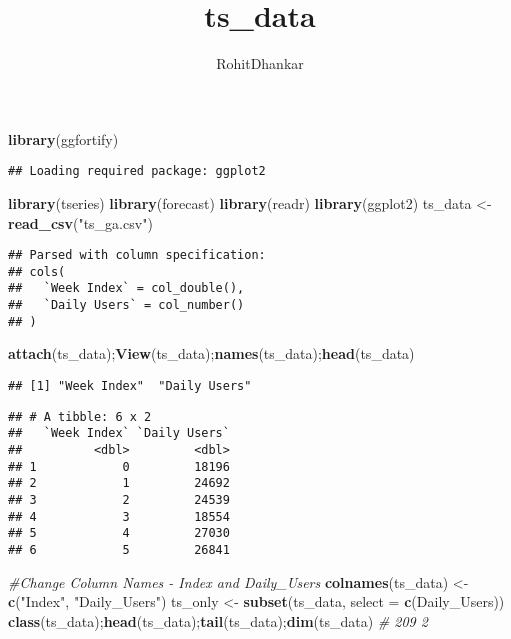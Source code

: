 \documentclass[]{article}
\title{ts\_data}
\author{RohitDhankar}
\date{}
\newenvironment{Shaded}{\begin{snugshade}}{\end{snugshade}}
\newcommand{\CommentTok}[1]{\textcolor[rgb]{0.56,0.35,0.01}{\textit{#1}}}
\newcommand{\DataTypeTok}[1]{\textcolor[rgb]{0.13,0.29,0.53}{#1}}
\newcommand{\KeywordTok}[1]{\textcolor[rgb]{0.13,0.29,0.53}{\textbf{#1}}}
\newcommand{\NormalTok}[1]{#1}
\newcommand{\StringTok}[1]{\textcolor[rgb]{0.31,0.60,0.02}{#1}}
\begin{document}
\maketitle

\begin{Shaded}
\begin{Highlighting}[]
\KeywordTok{library}\NormalTok{(ggfortify)}
\end{Highlighting}
\end{Shaded}

\begin{verbatim}
## Loading required package: ggplot2
\end{verbatim}

\begin{Shaded}
\begin{Highlighting}[]
\KeywordTok{library}\NormalTok{(tseries)}
\KeywordTok{library}\NormalTok{(forecast)}
\KeywordTok{library}\NormalTok{(readr)}
\KeywordTok{library}\NormalTok{(ggplot2)}
\NormalTok{ts_data <-}\StringTok{ }\KeywordTok{read_csv}\NormalTok{(}\StringTok{"ts_ga.csv"}\NormalTok{)}
\end{Highlighting}
\end{Shaded}

\begin{verbatim}
## Parsed with column specification:
## cols(
##   `Week Index` = col_double(),
##   `Daily Users` = col_number()
## )
\end{verbatim}

\begin{Shaded}
\begin{Highlighting}[]
\KeywordTok{attach}\NormalTok{(ts_data);}\KeywordTok{View}\NormalTok{(ts_data);}\KeywordTok{names}\NormalTok{(ts_data);}\KeywordTok{head}\NormalTok{(ts_data)}
\end{Highlighting}
\end{Shaded}

\begin{verbatim}
## [1] "Week Index"  "Daily Users"
\end{verbatim}

\begin{verbatim}
## # A tibble: 6 x 2
##   `Week Index` `Daily Users`
##          <dbl>         <dbl>
## 1            0         18196
## 2            1         24692
## 3            2         24539
## 4            3         18554
## 5            4         27030
## 6            5         26841
\end{verbatim}

\begin{Shaded}
\begin{Highlighting}[]
\CommentTok{#Change Column Names - Index and Daily_Users}
\KeywordTok{colnames}\NormalTok{(ts_data) <-}\StringTok{ }\KeywordTok{c}\NormalTok{(}\StringTok{"Index"}\NormalTok{, }\StringTok{"Daily_Users"}\NormalTok{)}
\NormalTok{ts_only <-}\StringTok{ }\KeywordTok{subset}\NormalTok{(ts_data, }\DataTypeTok{select =} \KeywordTok{c}\NormalTok{(Daily_Users))}
\KeywordTok{class}\NormalTok{(ts_data);}\KeywordTok{head}\NormalTok{(ts_data);}\KeywordTok{tail}\NormalTok{(ts_data);}\KeywordTok{dim}\NormalTok{(ts_data) }\CommentTok{# 209   2}
\end{Highlighting}
\end{Shaded}
\end{document}
